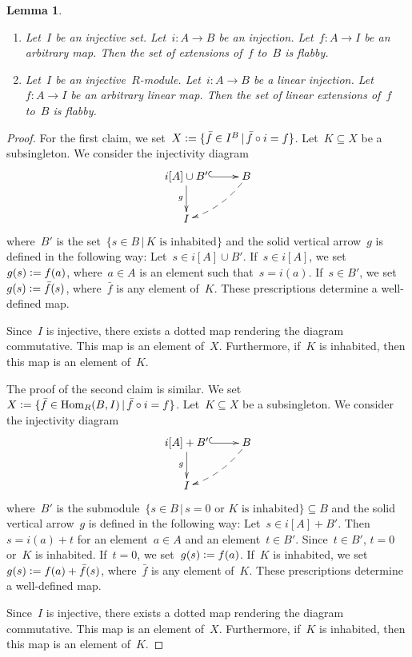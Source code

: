\documentclass[oneside]{amsart}
\theoremstyle{definition}
\theoremstyle{plain}
\newtheorem{lemma}[defn]{Lemma}
\theoremstyle{remark}
\newcommand{\defeq}{\vcentcolon=}
\DeclareMathOperator{\Hom}{Hom}
\renewcommand{\_}{\mathpunct{.}\,}
\begin{document}
\begin{lemma}\label{lemma:set-of-extensions-flabby}
\begin{enumerate}
\item Let~$I$ be an injective set. Let~$i : A \to B$ be an injection.
Let~$f : A \to I$ be an arbitrary map. Then the set of extensions of~$f$ to~$B$
is flabby.
\item Let~$I$ be an injective~$R$-module. Let~$i : A \to B$ be a linear injection.
Let~$f : A \to I$ be an arbitrary linear map. Then the set of linear extensions of~$f$ to~$B$
is flabby.
\end{enumerate}
\end{lemma}

\begin{proof}For the first claim, we set~$X \defeq \{ \bar{f} \in I^B \,|\, \bar{f} \circ i =
f \}$. Let~$K \subseteq X$ be a subsingleton. We consider the injectivity diagram
\[ \xymatrix{
  i[A] \cup B' \ar@{^{(}->}[r]\ar[d]_g & B \ar@{-->}@/^/[ld] \\
  I
} \]
where~$B'$ is the set~$\{ s \in B \,|\, \text{$K$ is inhabited} \}$ and the solid
vertical arrow~$g$ is defined in the following way: Let~$s \in i[A] \cup B'$.
If~$s \in i[A]$, we set~$g(s) \defeq f(a)$, where~$a \in A$ is an element such
that~$s = i(a)$. If~$s \in B'$, we set~$g(s) \defeq \bar{f}(s)$,
where~$\bar{f}$ is any element of~$K$. These prescriptions determine a well-defined
map.

Since~$I$ is injective, there exists a dotted map rendering the diagram
commutative. This map is an element of~$X$. Furthermore, if~$K$ is inhabited,
then this map is an element of~$K$.

The proof of the second claim is similar. We
set~$X \defeq \{ \bar{f} \in \Hom_R(B,I) \,|\, \bar{f} \circ i =
f \}$. Let~$K \subseteq X$ be a subsingleton. We consider the injectivity diagram
\[ \xymatrix{
  i[A] + B' \ar@{^{(}->}[r]\ar[d]_g & B \ar@{-->}@/^/[ld] \\
  I
} \]
where~$B'$ is the submodule~$\{ s \in B \,|\, \text{$s = 0$ or $K$ is
inhabited} \} \subseteq B$ and the solid vertical arrow~$g$ is defined in the following
way: Let~$s \in i[A] + B'$. Then~$s = i(a) + t$ for an element~$a \in A$ and an
element~$t \in B'$. Since~$t \in B'$, $t = 0$ or~$K$ is inhabited. If~$t = 0$,
we set~$g(s) \defeq f(a)$. If~$K$ is inhabited, we set~$g(s) \defeq f(a) +
\bar{f}(s)$, where~$\bar{f}$ is any element of~$K$. These prescriptions
determine a well-defined map.

Since~$I$ is injective, there exists a dotted map rendering the diagram
commutative. This map is an element of~$X$. Furthermore, if~$K$ is inhabited,
then this map is an element of~$K$.
\end{proof}
\end{document}
